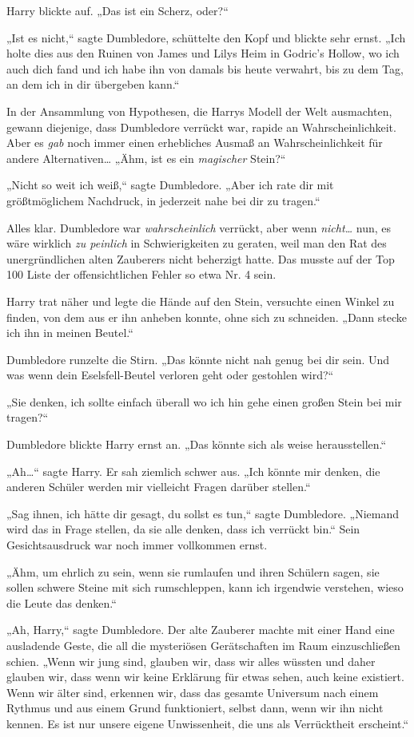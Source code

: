 {Harry blickte auf. „Das ist ein Scherz, oder?“

„Ist es nicht,“ sagte Dumbledore, schüttelte den Kopf und blickte sehr ernst. „Ich holte dies aus den Ruinen von James und Lilys Heim in Godric's Hollow, wo ich auch dich fand und ich habe ihn von damals bis heute verwahrt, bis zu dem Tag, an dem ich in dir übergeben kann.“

In der Ansammlung von Hypothesen, die Harrys Modell der Welt ausmachten, gewann diejenige, dass Dumbledore verrückt war, rapide an Wahrscheinlichkeit. Aber es \emph{gab} noch immer einen erhebliches Ausmaß an Wahrscheinlichkeit für andere Alternativen… „Ähm, ist es ein \emph{magischer} Stein?“

„Nicht so weit ich weiß,“ sagte Dumbledore. „Aber ich rate dir mit größtmöglichem Nachdruck, in jederzeit nahe bei dir zu tragen.“

Alles klar. Dumbledore war \emph{wahrscheinlich} verrückt, aber wenn \emph{nicht…} nun, es wäre wirklich \emph{zu peinlich} in Schwierigkeiten zu geraten, weil man den Rat des unergründlichen alten Zauberers nicht beherzigt hatte. Das musste auf der Top 100 Liste der offensichtlichen Fehler so etwa Nr. 4 sein.

Harry trat näher und legte die Hände auf den Stein, versuchte einen Winkel zu finden, von dem aus er ihn anheben konnte, ohne sich zu schneiden. „Dann stecke ich ihn in meinen Beutel.“

Dumbledore runzelte die Stirn. „Das könnte nicht nah genug bei dir sein. Und was wenn dein Eselsfell-Beutel verloren geht oder gestohlen wird?“

„Sie denken, ich sollte einfach überall wo ich hin gehe einen großen Stein bei mir tragen?“

Dumbledore blickte Harry ernst an. „Das könnte sich als weise herausstellen.“

„Ah…“ sagte Harry. Er sah ziemlich schwer aus. „Ich könnte mir denken, die anderen Schüler werden mir vielleicht Fragen darüber stellen.“

„Sag ihnen, ich hätte dir gesagt, du sollst es tun,“ sagte Dumbledore. „Niemand wird das in Frage stellen, da sie alle denken, dass ich verrückt bin.“ Sein Gesichtsausdruck war noch immer vollkommen ernst.

„Ähm, um ehrlich zu sein, wenn sie rumlaufen und ihren Schülern sagen, sie sollen schwere Steine mit sich rumschleppen, kann ich irgendwie verstehen, wieso die Leute das denken.“

„Ah, Harry,“ sagte Dumbledore. Der alte Zauberer machte mit einer Hand eine ausladende Geste, die all die mysteriösen Gerätschaften im Raum einzuschließen schien. „Wenn wir jung sind, glauben wir, dass wir alles wüssten und daher glauben wir, dass wenn wir keine Erklärung für etwas sehen, auch keine existiert. Wenn wir älter sind, erkennen wir, dass das gesamte Universum nach einem Rythmus und aus einem Grund funktioniert, selbst dann, wenn wir ihn nicht kennen. Es ist nur unsere eigene Unwissenheit, die uns als Verrücktheit erscheint.“

}
